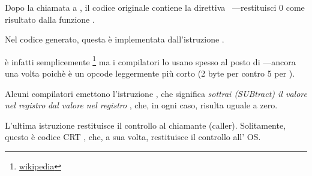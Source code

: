 Dopo la chiamata a \printf, il codice \CCpp originale contiene la direttiva ~---restituisci 0 come risultato dalla funzione \main.

Nel codice generato, questa è implementata dall'istruzione .


\XOR è infatti semplicemente \footnote{\href{http://en.wikipedia.org/wiki/Exclusive_or}{wikipedia}} ma i compilatori lo usano spesso al posto di
---ancora una volta poichè è un opcode leggermente più corto (2 byte per \XOR contro 5 per \MOV).

Alcuni compilatori emettono l'istruzione , che significa \emph{sottrai (SUBtract) il valore nel registro} \EAX \emph{dal valore nel registro} \EAX, che, in ogni caso, risulta uguale a zero.

L'ultima istruzione \RET restituisce il controllo al chiamante (\gls{caller}). Solitamente, questo è codice \CCpp \ac{CRT} , che, a sua volta, restituisce il controllo all' \ac{OS}.
